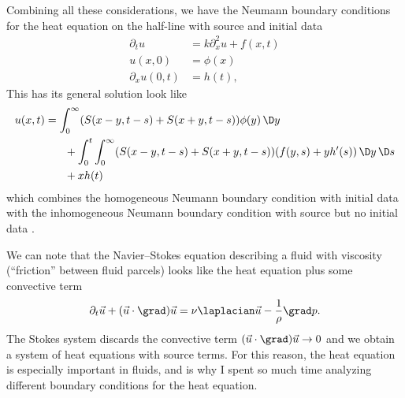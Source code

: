 \begin{node}
\begin{node}\label{pde:heat-000N}%
Combining all these considerations, we have the Neumann boundary
conditions for the heat equation on the half-line with source and
initial data
\begin{subequations}
\begin{align}
\partial_{t}u &= k\partial_{x}^{2}u + f(x,t)\\
u(x,0) &= \phi(x)\\
\partial_{x}u(0,t) &= h(t),
\end{align}
\end{subequations}
This has its general solution look like
\begin{equation}
\begin{split}
u(x,t) &= \int^{\infty}_{0}(S(x-y,t-s)+S(x+y,t-s))\phi(y)\,\D y\\
&\phantom{=}\quad+\int^{t}_{0}\int^{\infty}_{0}(S(x-y,t-s)+S(x+y,t-s))(f(y,s)+yh'(s))\,\D y\,\D s\\
&\phantom{=}\quad+xh(t)
\end{split}
\end{equation}
which combines the homogeneous Neumann boundary condition with initial data 
with the inhomogeneous Neumann boundary condition with source but no
initial data .
\end{node} %

\end{node} %


\begin{node}\label{pde:heat-000O}%
We can note that the Navier--Stokes equation describing a fluid with
viscosity (``friction'' between fluid parcels) looks like the heat
equation plus some convective term
\begin{equation*}
\partial_{t}\vec{u}+(\vec{u}\cdot\grad)\vec{u}=\nu\laplacian\vec{u}-\frac{1}{\rho}\grad p.
\end{equation*}
The Stokes system discards the convective term $(\vec{u}\cdot\grad)\vec{u}\to0$
and we obtain a system of heat equations with source terms. For this
reason, the heat equation is especially important in fluids, and is why
I spent so much time analyzing different boundary conditions for the
heat equation.
\end{node} %
